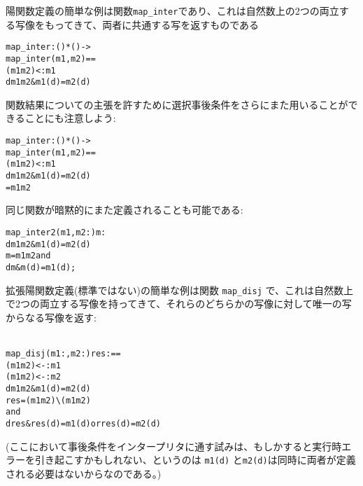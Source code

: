 \documentclass[\pformat,12pt]{jarticle}
\begin{document}
陽関数定義の簡単な例は関数\texttt{map\_inter}であり、これは自然数上の2つの両立する写像をもってきて、両者に共通する写を返すものである
\begin{alltt}
  map_inter: () * () -> 
  map_inter (m1,m2) ==
    ( m1   m2) <: m1
    d  m1  m2 & m1(d) = m2(d)
\end{alltt}
関数結果についての主張を許すために選択事後条件をさらにまた用いることができることにも注意しよう:
\begin{alltt}
  map_inter: () * () -> 
  map_inter (m1,m2) ==
    ( m1   m2) <: m1
    d  m1  m2 & m1(d) = m2(d)
     =  m1   m2
\end{alltt}

同じ関数が暗黙的にまた定義されることも可能である:
\begin{alltt}
  map_inter2 (m1,m2: ) m: 
    d  m1  m2 & m1(d) = m2(d)
    m =  m1  m2 and
        d  m & m(d) = m1(d);
\end{alltt}

拡張陽関数定義(標準ではない)の簡単な例は関数 \texttt{map\_disj} で、これは自然数上で2つの両立する写像を持ってきて、それらのどちらかの写像に対して唯一の写からなる写像を返す:

\begin{alltt}\label{mapdisj}
  map_disj (m1:,m2:) res :  ==
    ( m1  m2) <-: m1 
    ( m1  m2) <-: m2
    d  m1  m2 & m1(d) = m2(d)
    res = ( m1  m2) \verb+\+ ( m1  m2) 
       and
        d  res & res(d) = m1(d) or res(d) = m2(d)
\end{alltt}
(ここにおいて事後条件をインタープリタに通す試みは、もしかすると実行時エラーを引き起こすかもしれない、というのは \texttt{m1(d)} と\texttt{m2(d)}は同時に両者が定義される必要はないからなのである。)
\end{document}
